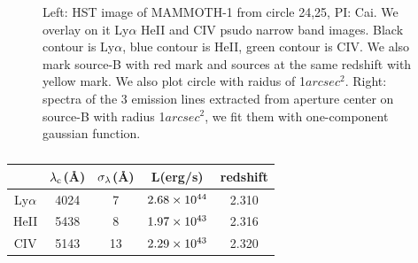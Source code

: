 \begin{figure}
		\centering
		\label{overlayspec}
		\caption{Left: HST image of MAMMOTH-1 from circle 24,25, PI: Cai. We overlay on it Ly$\alpha$ HeII and CIV psudo narrow band images. Black contour is Ly$\alpha$, blue contour is HeII, green contour is CIV. We also mark source-B with red mark and sources at the same redshift with yellow mark. We also plot circle with raidus of 1$arcsec^{2}$. Right: spectra of the 3 emission lines extracted from aperture center on source-B with radius 1$arcsec^{2}$, we fit them with one-component gaussian function.}
\end{figure}
	\begin{table}[htp]
	\begin{center}
		\begin{tabular}{ccccc}
\hline
\hline
& $\rm \lambda_{c}$(\AA) & $\rm \sigma_{\lambda}$(\AA) & L(erg/s) & redshift \\ \hline
Ly$\alpha$ &   4024  &     7  &   $\rm 2.68 \times 10^{44}$ & 2.310        \\
HeII       &   5438  &     8  &   $\rm 1.97 \times 10^{43}$ & 2.316        \\
CIV        &   5143  &     13 &   $\rm 2.29 \times 10^{43}$ & 2.320        \\ \hline
\end{tabular}
\end{center}
	\caption{}
	\label{fit_L}
	\end{table}

